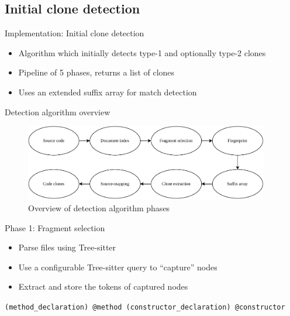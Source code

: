 \documentclass[aspectratio=1610, xcolor=table]{beamer}
\begin{document}
\subsection{Initial clone detection}

\begin{frame}{Implementation: Initial clone detection}
    \begin{itemize}
        \item Algorithm which initially detects type-1 and optionally type-2 clones
        \item Pipeline of 5 phases, returns a list of clones
        \item Uses an extended suffix array for match detection
    \end{itemize}
\end{frame}

\begin{frame}{Detection algorithm overview}
    \begin{figure}
        \begin{center}
            \includegraphics[width=0.95\textwidth]{figures/phases_all.drawio.pdf}
        \end{center}
        \caption{Overview of detection algorithm phases}
    \end{figure}
\end{frame}

\begin{frame}[fragile]{Phase 1: Fragment selection}
    \begin{itemize}
        \item Parse files using Tree-sitter
        \item Use a configurable Tree-sitter query to ``capture'' nodes
        \item Extract and store the tokens of captured nodes
    \end{itemize}
    \vspace{1cm}
    \begin{center}
        \verb|(method_declaration) @method (constructor_declaration) @constructor|
    \end{center}
\end{frame}
\end{document}
